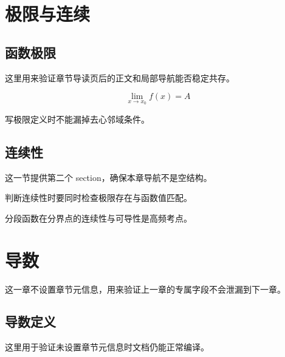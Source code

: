 \documentclass[a4paper,12pt,oneside]{maki-notes}
\begin{document}
\frontmatter
\tableofcontents

\mainmatter


\chapter{极限与连续}

\section{函数极限}
这里用来验证章节导读页后的正文和局部导航能否稳定共存。

\begin{keyformula}
\[
  \lim_{x \to x_0} f(x) = A
\]
\end{keyformula}

\begin{pitfall}[易错点]
写极限定义时不能漏掉去心邻域条件。
\end{pitfall}

\section{连续性}
这一节提供第二个 section，确保本章导航不是空结构。

\begin{methodnote}
判断连续性时要同时检查极限存在与函数值匹配。
\end{methodnote}

\begin{examfocus}
分段函数在分界点的连续性与可导性是高频考点。
\end{examfocus}

\chapter{导数}
这一章不设置章节元信息，用来验证上一章的专属字段不会泄漏到下一章。

\section{导数定义}
这里用于验证未设置章节元信息时文档仍能正常编译。
\end{document}
